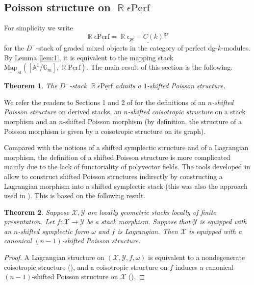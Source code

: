 \documentclass[reqno]{amsart}
\DeclareMathOperator\R{\mathbb R}
\newtheorem{theorem}{Theorem}[section]
\theoremstyle{definition}
\theoremstyle{remark}
\newcommand{\G}{{\mathbb G}}
\newcommand{\A}{{\mathbb A}}
\newcommand{\ul}{\underline}
\newcommand{\eps}{\epsilon}
\newcommand{\uperf}{\ul{\mathrm{Perf}}}
\newcommand{\gr}{\mathbf{gr}}
\newcommand{\Map}{{\mathrm{Map}}}
\newcommand{\sX}{\mathscr{X}}
\newcommand{\sY}{\mathscr{Y}}
\numberwithin{equation}{section}
\begin{document}
\subsection{Poisson structure on $\R\eps\uperf$}
For simplicity we write
\[
\R\eps\uperf=\R\ul{\eps_{pe}-C(k)^\gr}
\] for the $D^-$-stack of graded mixed objects in the category of perfect dg-$k$-modules. By Lemma \ref{lem:1}, it is equivalent to the mapping stack $\ul{\Map}_{st}([\A^1\big/\G_m],\R\uperf)$. The main result of this section is the following.

\begin{theorem}\label{thm:mixmoduliPoisson}
The $D^-$-stack $\R\eps\uperf$ admits a $1$-shifted Poisson structure.
\end{theorem} 

We refer the readers to Sections 1 and 2 of \cite{MS2} for the definitions of an {\it $n$-shifted Poisson structure} on derived stacks, an {\it $n$-shifted coisotropic structure} on a stack morphism and an {$n$-shifted Poisson morphism} (by definition, the structure of a Poisson morphism is given by a coisotropic structure on its graph). 

Compared with the notions of a shifted symplectic structure and of a Lagrangian morphism, the definition of a shifted Poisson structure is  more complicated mainly due to the lack of functoriality of polyvector fields. 
The tools developed in \cite{MS2} allow to construct shifted Poisson structures indirectly by constructing a Lagrangian morphism into a shifted symplectic stack 
(this was also the approach used in \cite[Section 3.1]{HP1}). This is based on the following result.

\begin{theorem}\label{thm:MS}
Suppose $\sX, \sY$ are locally geometric stacks locally of finite presentation.
Let $f:\sX\to \sY$ be a stack morphism. Suppose that $\sY$ is equipped with an $n$-shifted symplectic form $\omega$ and $f$ is Lagrangian. Then $\sX$ is equipped with a canonical $(n-1)$-shifted Poisson structure.
\end{theorem}
\begin{proof}
A Lagrangian structure on $(\sX,\sY,f,\omega)$ is equivalent to a nondegenerate coisotropic structure (\cite[Therorem 4.22]{MS2}), and
a coisotropic structure on $f$ induces a canonical $(n-1)$-shifted Poisson structure on $\sX$ (\cite[Section 2.1]{MS2}),  
\end{proof}
\end{document}
